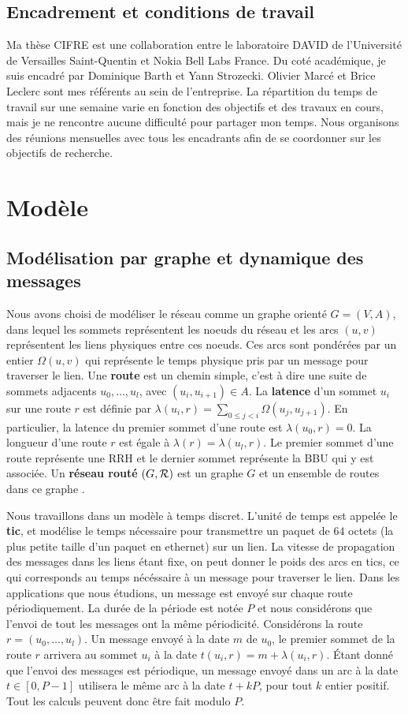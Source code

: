 \documentclass{article}
\begin{document}
  \subsection*{Encadrement et conditions de travail}
  Ma thèse CIFRE est une collaboration entre le laboratoire DAVID de l'Université de Versailles Saint-Quentin et Nokia Bell Labs France.
  Du coté académique, je suis encadré par Dominique Barth et Yann Strozecki. Olivier Marcé et Brice Leclerc sont mes référents au sein de l'entreprise. La répartition du temps de travail sur une semaine varie en fonction des objectifs et des travaux en cours, mais je ne rencontre aucune difficulté pour partager mon temps. Nous organisons des réunions mensuelles avec tous les encadrants afin de se coordonner sur les objectifs de recherche.
  
\section{Modèle}

\subsection{Modélisation par graphe et dynamique des messages}
  Nous avons choisi de modéliser le réseau comme un graphe orienté $G=(V,A)$, dans lequel les sommets représentent les noeuds du réseau et les arcs $(u,v)$ représentent les liens physiques entre ces noeuds. Ces arcs sont pondérées par un entier $\Omega(u,v)$  qui représente le temps physique pris par un message pour traverser le lien. Une {\bf route} est un chemin simple, c'est à dire une suite de sommets adjacents $u_0, \ldots , u_{l}$, avec $(u_i,u_{i+1}) \in A$. La {\bf latence} d'un sommet $u_i$ sur une route $r$ est définie par $\lambda(u_i,r)= \sum\limits_{0 \leq j <i} \Omega(u_j, u_{j+1})$. En particulier, la latence du premier sommet d'une route est $\lambda(u_0,r)=0$. La longueur d'une route $r$ est égale à  $\lambda (r)= \lambda (u_l,r)$. 
  Le premier sommet d'une route représente une RRH et le dernier sommet représente la BBU qui y est associée.
  Un {\bf réseau routé} $(G, {\cal R})$ est un graphe $G$ et un ensemble de routes dans ce graphe .

Nous travaillons dans un modèle à temps discret. L'unité de temps est appelée le {\bf tic}, et modélise le temps nécessaire pour transmettre un paquet de $64$ octets (la plus petite taille d'un paquet en ethernet) sur un lien. La vitesse de propagation des messages dans les liens étant fixe, on peut donner le poids des arcs en tics, ce qui corresponds au temps nécéssaire à un message pour traverser le lien.
Dans les applications que nous étudions, un message est envoyé sur chaque route périodiquement. La durée de la période est notée $P$ et nous considérons que l'envoi de tout les messages ont la même périodicité.
Considérons la route $r=(u_0,\dots,u_l)$. Un message envoyé à la date $m$ de $u_0$, le premier sommet de la route $r$ arrivera au sommet $u_i$ à la date $t(u_i,r) = m + \lambda(u_i,r)$. 
Étant donné que l'envoi des messages est périodique, un message envoyé dans un arc à la date $t\in [0,P-1]$ utilisera le même arc à la date $t+kP$, pour tout $k$ entier positif. Tout les calculs peuvent donc être fait modulo $P$.
\end{document}
